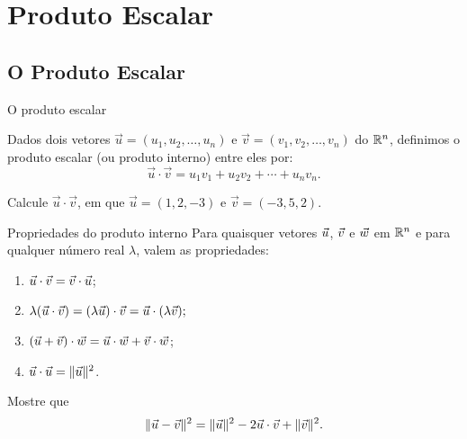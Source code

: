 \section{Produto Escalar}

\subsection*{O Produto Escalar}

\begin{frame}[label=vetores2]{O produto escalar}

\begin{defin}
Dados dois vetores $\vec{u}=(u_1,u_2,\ldots,u_n)$ e $\vec{v}=(v_1,v_2,\ldots,v_n)$ do $\mathbb{R}^n$, definimos o {\color{blue} produto escalar (ou produto interno)} entre eles por:
\[\vec{u}\cdot \vec{v}=u_1v_1+u_2v_2+\cdots+ u_nv_n.\]
\end{defin}

\begin{exe}
Calcule $\vec{u}\cdot \vec{v}$, em que $\vec{u}=(1,2,-3)$ e $\vec{v}=(-3,5,2)$.
\end{exe}

\end{frame}

\begin{frame}[label=vetores2]

\begin{block}{Propriedades do produto interno} Para quaisquer vetores $\vec{u}$, $\vec{v}$ e $\vec{w}$ em $\mathbb{R}^n$ e para qualquer número real $\lambda$, valem as propriedades:
			
			\begin{enumerate}
				\item ${\vec{u}}\cdot {\vec{v}}={\vec{v}}\cdot{\vec{u}}$;
				\item $\lambda( {\vec{u}}\cdot {\vec{v}})=(\lambda  {\vec{u}})\cdot {\vec{v}}=  {\vec{u}}\cdot(\lambda {\vec{v}});$
				\item $( {\vec{u}}+ \vec{v})\cdot {\vec{w}}= {\vec{u}}\cdot {\vec{w}}+ {\vec{v}}\cdot {\vec{w}}$;
				\item $ {\vec{u}}\cdot {\vec{u}}=\| {\vec{u}}\|^2$.
			\end{enumerate}            
		\end{block}
\begin{exe}
Mostre que
\[\|\vec{u}-\vec{v}\|^2=\|\vec{u}\|^2-2\vec{u}\cdot \vec{v}+\|\vec{v}\|^2.\]
\end{exe}

\end{frame}

